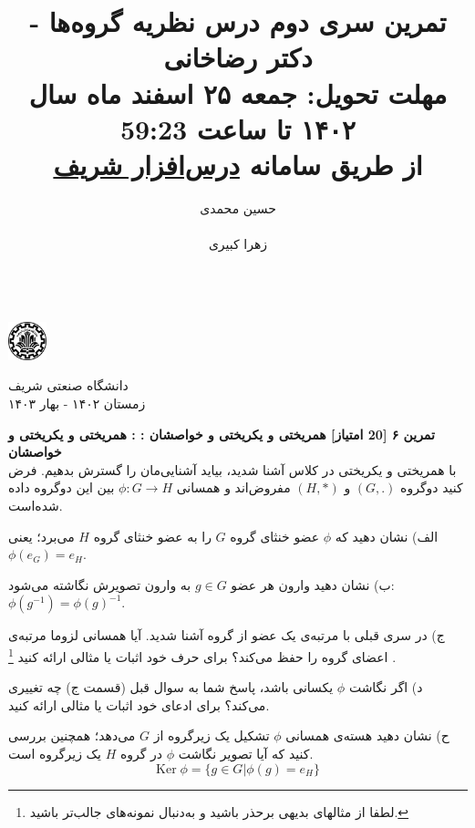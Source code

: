 \documentclass{article}
\title{
	\vspace{-0.8em}
تمرین سری دوم درس نظریه گروه‌ها - دکتر رضاخانی
\\
{\normalsize
\textbf{مهلت تحویل:
جمعه ۲۵ اسفند ماه سال ۱۴۰۲ تا ساعت 59:23
\\
\vspace{-0.4em}
از طریق سامانه
\href{https://cw.sharif.edu/}{درس‌افزار شریف}
}
}
\vspace{-0.6em}
}
\author{
حسین محمدی\\
  \lr{
  		\href{mailto:hossein.mohammadi.00427@gmail.com}{\texttt{	hossein.mohammadi.00427@gmail.com}}} \\
  \And
  زهرا کبیری\\
 \lr{
  		\href{mailto:kabiri.zahra98@gmail.com}{ \texttt{kabiri.zahra98@gmail.com}}}\\
  }
\newenvironment{exercise}[3][\unskip]{%
	\par
	\noindent
	\textbf{تمرین
		#1
		[#2 امتیاز] 
		\def\temp{#3}\ifx\temp\empty
		: 
		\else
		: #3 \vspace{0.5em} \\ \noindent
		\fi
}}{}
\begin{document}
\begin{minipage}{0.1\textwidth}%
\includegraphics[width=1.1cm]{sharif-logo.png}
\end{minipage}%
\hfill%
\begin{minipage}{0.9\textwidth}\raggedleft
دانشگاه صنعتی شریف\\
زمستان ۱۴۰۲ - بهار ۱۴۰۳\\
\end{minipage}

\makepertitle


\begin{exercise}[۶]{20}{همریختی و یکریختی و خواصشان}
	با همریختی و یکریختی در کلاس آشنا شدید، بیاید آشنایی‌مان را گسترش بدهیم. فرض کنید دوگروه 
	$(G,.)$
	و
	$(H,*)$
	مفروض‌اند و همسانی
	$\phi: G \to H$
	بین این دوگروه داده ‌شده‌است.
	
	\vspace{0.5em}
	\noindent
	الف) نشان دهید که 
	$\phi$
	عضو خنثای گروه 
	$G$ را به عضو خنثای گروه 
	$H$ می‌برد؛ یعنی 
	$\phi(e_G) = e_H$.
	
	\noindent
	ب) نشان دهید وارون هر عضو 
	$g \in G$ 
	به وارون تصویرش نگاشته می‌شود:
	$\phi(g^{-1}) = \phi(g)^{-1}$.
	
	\noindent
	ج) در سری قبلی با مرتبه‌ی یک عضو از گروه آشنا شدید. آیا همسانی لزوما مرتبه‌ی اعضای گروه را حفظ می‌کند؟ برای حرف خود اثبات یا مثالی ارائه کنید
	\footnote{لطفا از مثالهای بدیهی برحذر باشید و به‌دنبال نمونه‌های جالب‌تر باشید.}
	.
	
	\noindent
	د) اگر نگاشت 
	$\phi$
	یکسانی باشد، پاسخ شما به سوال قبل (قسمت ج) چه تغییری می‌کند؟ برای ادعای خود اثبات یا مثالی ارائه کنید. 
	
	\noindent
	ح) نشان دهید هسته‌ی همسانی $\phi$ تشکیل یک زیرگروه از $G$ می‌دهد؛ همچنین بررسی کنید که آیا تصویر نگاشت $\phi$ در گروه $H$ یک زیرگروه است.
	\setlength{\abovedisplayskip}{0pt} \setlength{\belowdisplayskip}{0pt} \setlength{\abovedisplayshortskip}{0pt} \setlength{\belowdisplayshortskip}{0pt}
	\[
	\text{Ker}\; \phi = \{ g\in G \big| \phi(g) = e_H\}
	\]
	
	
\end{exercise}
\end{document}
